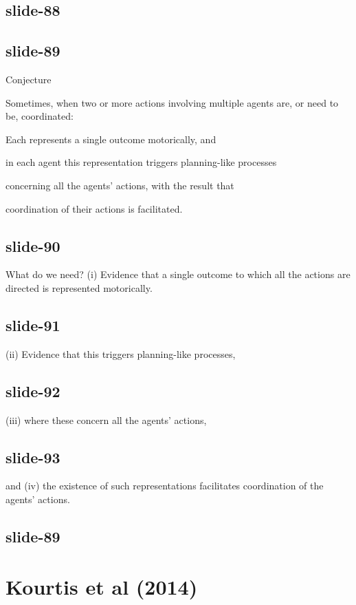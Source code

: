 \documentclass[12pt,\papersize]{extarticle}
\begin{document}
\subsection{slide-88}

\subsection{slide-89}
Conjecture



Sometimes, when two or more actions involving multiple agents are, or need to be, coordinated:




Each represents a single outcome motorically, and


in each agent this representation triggers planning-like processes


concerning all the agents’ actions, with the result that


coordination of their actions is facilitated.



\subsection{slide-90}
What do we need?
(i) Evidence that a single outcome to which all the actions are directed is represented motorically.

\subsection{slide-91}
(ii) Evidence that this triggers planning-like processes,

\subsection{slide-92}
(iii) where these  concern all the agents' actions,

\subsection{slide-93}
and (iv) the existence of such representations facilitates coordination of the agents' actions.

\subsection{slide-89}


\section{Kourtis et al (2014)}
\end{document}

